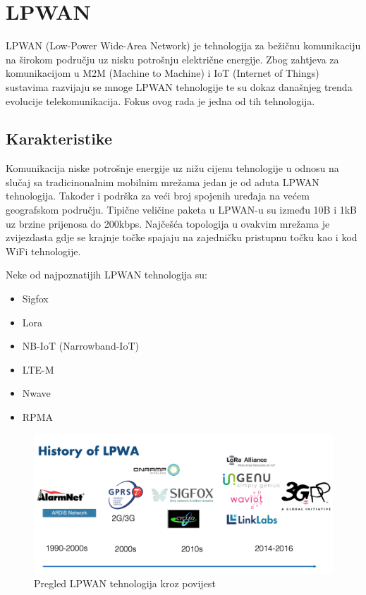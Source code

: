 \chapter{LPWAN}
\label{chapter:lpwan}

LPWAN (Low-Power Wide-Area Network) je tehnologija za bežičnu komunikaciju na širokom području uz nisku potrošnju električne energije. Zbog zahtjeva za komunikacijom u M2M (Machine to Machine) i IoT (Internet of Things) sustavima razvijaju se mnoge LPWAN tehnologije te su dokaz današnjeg trenda evolucije telekomunikacija. Fokus ovog rada je jedna od tih tehnologija.
\newline

\section{Karakteristike}
\label{section:lpwan_karakteristike}
Komunikacija niske potrošnje energije uz nižu cijenu tehnologije u odnosu na slučaj sa tradicinonalnim mobilnim mrežama jedan je od aduta LPWAN tehnologija. Također i podrška za veći broj spojenih uređaja na većem geografskom području.
\newline
Tipične veličine paketa u LPWAN-u su između 10B i 1kB uz brzine prijenosa do 200kbps. Najčešća topologija u ovakvim mrežama je zvijezdasta gdje se krajnje točke spajaju na zajedničku pristupnu točku kao i kod WiFi tehnologije.
\newline

Neke od najpoznatijih LPWAN tehnologija su: \begin{itemize}
\item Sigfox
\item Lora
\item NB-IoT (Narrowband-IoT)
\item LTE-M
\item Nwave
\item RPMA
\end{itemize}

\begin{figure}[ht!]
\centering
\includegraphics[width=1.0\textwidth]{images/lpwan_history.png}
\caption{Pregled LPWAN tehnologija kroz povijest}
\label{img:lpwan_overview}
\end{figure}

